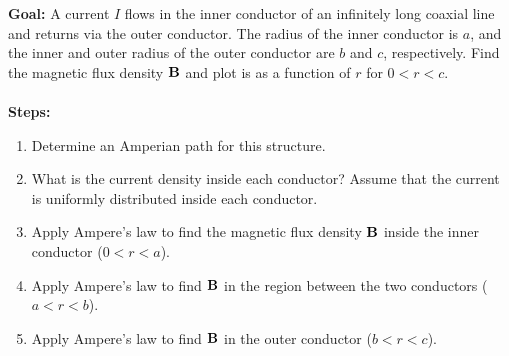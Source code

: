 \documentclass[../../header.tex]{subfiles}
\begin{document}
\textbf{Goal:} A current $I$ flows in the inner conductor of an infinitely long coaxial line and returns via the outer conductor. The radius of the inner conductor is $a$, and the inner and outer radius of the outer conductor are $b$ and $c$, respectively. Find the magnetic flux density $\mathbf{B}$ and plot is as a function of $r$ for $0 < r < c$.\\
\\
\textbf{Steps:} 
\begin{enumerate}
\item Determine an Amperian path for this structure.\\

\item What is the current density inside each conductor? Assume that the current is uniformly distributed inside each conductor.\\

\item Apply Ampere's law to find the magnetic flux density $\mathbf{B}$ inside the inner conductor ($0<r<a$).\\

\item Apply Ampere's law to find $\mathbf{B}$ in the region between the two conductors ($a<r<b$).\\

\item Apply Ampere's law to find $\mathbf{B}$ in the outer conductor ($b<r<c$).\\


\end{enumerate}
\end{document}
